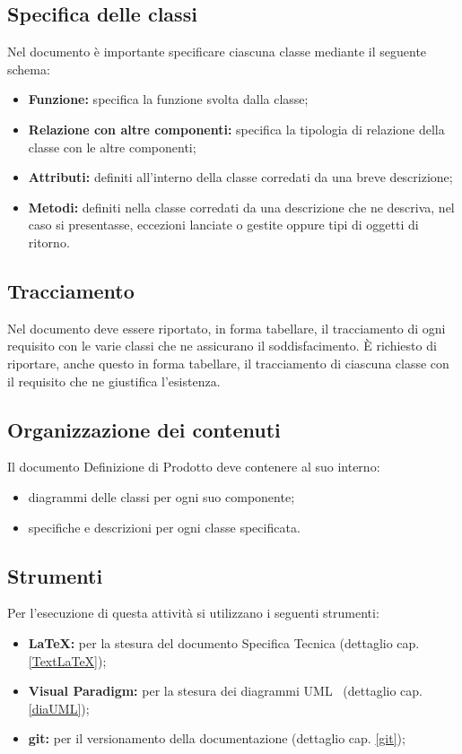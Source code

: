 {\subsection{Specifica delle classi}{
Nel documento è importante specificare ciascuna classe mediante il seguente schema:
\begin{itemize}
	\item {\textbf{Funzione:}} specifica la funzione svolta dalla classe;
	\item {{\textbf{Relazione con altre componenti:}} specifica la tipologia di relazione della classe con le altre componenti;
	}
	\item {\textbf{Attributi:}} definiti all'interno della classe corredati da una breve descrizione;
	\item {\textbf{Metodi:}} definiti nella classe corredati da una descrizione che ne descriva, nel caso si presentasse, eccezioni lanciate o gestite oppure tipi di oggetti di ritorno.
\end{itemize}
}%

\subsection{Tracciamento} {
Nel documento deve essere riportato, in forma tabellare, il tracciamento di ogni requisito con le varie classi che ne assicurano il soddisfacimento.
\`E richiesto di riportare, anche questo in forma tabellare, il tracciamento di ciascuna classe con il requisito che ne giustifica l'esistenza.
}%

\subsection{Organizzazione dei contenuti}{
Il documento Definizione di Prodotto deve contenere al suo interno:
\begin{itemize}
	\item diagrammi delle classi per ogni suo componente;
	\item specifiche e descrizioni per ogni classe specificata.
\end{itemize}
}%

\subsection{Strumenti} {
Per l'esecuzione di questa attività si utilizzano i seguenti strumenti:
\begin{itemize}
	\item []{\textbf{\LaTeX :} per la stesura del documento Specifica Tecnica (dettaglio cap. \ref{TextLaTeX});}
	\item []{\textbf{Visual Paradigm:} per la stesura dei diagrammi UML\g~ (dettaglio cap. \ref{diaUML});}
	\item []{\textbf{git:} per il versionamento della documentazione (dettaglio cap. \ref{git});}
\end{itemize}

}%

}%
